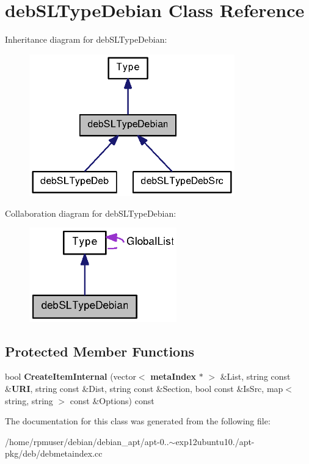 \section{deb\-S\-L\-Type\-Debian \-Class \-Reference}
\label{classdebSLTypeDebian}


\-Inheritance diagram for deb\-S\-L\-Type\-Debian\-:
\nopagebreak
\begin{figure}[H]
\begin{center}
\leavevmode
\includegraphics[width=252pt]{classdebSLTypeDebian__inherit__graph}
\end{center}
\end{figure}


\-Collaboration diagram for deb\-S\-L\-Type\-Debian\-:
\nopagebreak
\begin{figure}[H]
\begin{center}
\leavevmode
\includegraphics[width=181pt]{classdebSLTypeDebian__coll__graph}
\end{center}
\end{figure}
\subsection*{\-Protected \-Member \-Functions}
\begin{DoxyCompactItemize}
\item 
bool {\bfseries \-Create\-Item\-Internal} (vector$<$ {\bf meta\-Index} $\ast$ $>$ \&\-List, string const \&{\bf \-U\-R\-I}, string const \&\-Dist, string const \&\-Section, bool const \&\-Is\-Src, map$<$ string, string $>$ const \&\-Options) const \label{classdebSLTypeDebian_a032bfe3610f3a9a2a4759350dbd9a4f3}

\end{DoxyCompactItemize}


\-The documentation for this class was generated from the following file\-:\begin{DoxyCompactItemize}
\item 
/home/rpmuser/debian/debian\-\_\-apt/apt-\/0..$\sim$exp12ubuntu10./apt-\/pkg/deb/debmetaindex.\-cc\end{DoxyCompactItemize}
